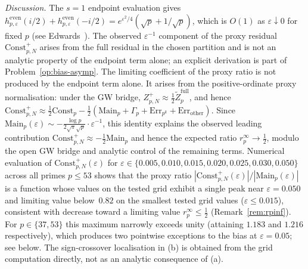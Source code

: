 \documentclass[11pt]{article}
\begin{document}
\emph{Discussion.}
The $s=1$ endpoint evaluation gives
$h^{\mathrm{even}}_{p,\varepsilon}(i/2)+h^{\mathrm{even}}_{p,\varepsilon}(-i/2)
= e^{\varepsilon^2/4}(\sqrt p+1/\sqrt p)$,
which is $O(1)$ as $\varepsilon\downarrow0$ for fixed $p$
(see Edwards~\cite[\S1.8, \S1.16, and \S3.6]{Edwards}).
The observed $\varepsilon^{-1}$ component of the proxy residual
$\mathrm{Const}^+_{p,N}$ arises from the full
residual in the chosen partition and is not an analytic property
of the endpoint term alone; an explicit derivation is part of
Problem~\ref{op:bias-asymp}.
The limiting coefficient of the proxy ratio is not produced by the
endpoint term alone.
It arises from the positive-ordinate proxy normalisation: under the
GW bridge, $Z_{p,N}^+\approx\tfrac12\widetilde Z_p^{\mathrm{full}}$,
and hence
$\mathrm{Const}^+_{p,N}\approx
\tfrac12\mathrm{Const}_p-\tfrac12(\mathrm{Main}_p+\Gamma_p
+\mathrm{Err}_{p^k}+\mathrm{Err}_{\mathrm{other}})$.
Since $\mathrm{Main}_p(\varepsilon)\sim
-\frac{\log p}{2\sqrt\pi\sqrt p}\cdot\varepsilon^{-1}$, this
identity explains the observed leading contribution
$\mathrm{Const}^+_{p,N}\approx-\tfrac12\mathrm{Main}_p$ and hence
the expected ratio $r_p^\infty\to\tfrac12$, modulo the open GW bridge
and analytic control of the remaining terms.
Numerical evaluation of $\mathrm{Const}^+_{p,N}(\varepsilon)$ for
$\varepsilon\in\{0.005,0.010,0.015,0.020,0.025,0.030,0.050\}$ across
all primes $p\le 53$ shows that the proxy ratio
$|\mathrm{Const}^+_{p,N}(\varepsilon)|/|\mathrm{Main}_p(\varepsilon)|$ is a
function whose values on the tested grid exhibit a single peak near
$\varepsilon=0.050$ and limiting value
below~$0.82$ on the smallest tested grid values ($\varepsilon\le 0.015$),
consistent with decrease toward a limiting value
$r_p^{\infty}\le\tfrac12$ (Remark~\ref{rem:rpinf}).
For $p\in\{37,53\}$ this maximum narrowly exceeds unity (attaining
$1.183$ and $1.216$ respectively), which produces two pointwise
exceptions to the bias at $\varepsilon=0.05$; see below.
The sign-crossover localisation in (b) is obtained from the grid
computation directly, not as an analytic consequence of (a).
\end{document}

